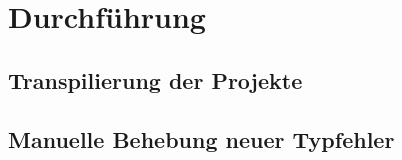 \chapter{Durchführung}

\section{Transpilierung der Projekte}
\section{Manuelle Behebung neuer Typfehler}
